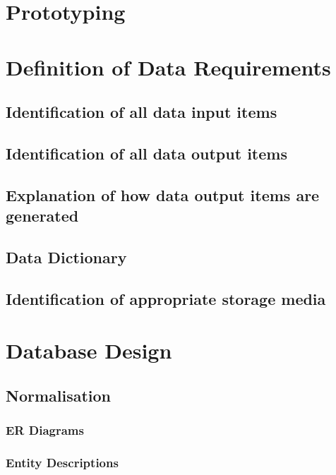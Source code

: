 \section{Prototyping}

\section{Definition of Data Requirements}

\subsection{Identification of all data input items}

\subsection{Identification of all data output items}

\subsection{Explanation of how data output items are generated}

\subsection{Data Dictionary}

\subsection{Identification of appropriate storage media}

\section{Database Design}

\subsection{Normalisation}

\subsubsection{ER Diagrams}

\subsubsection{Entity Descriptions}

